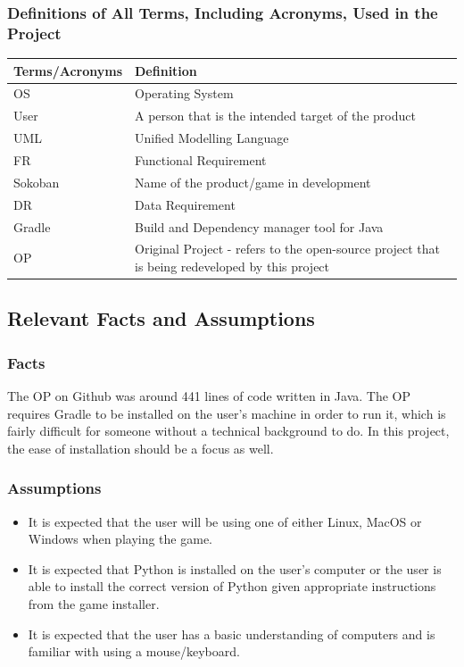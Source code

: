 \documentclass[12pt, titlepage]{article}
\begin{document}
\subsubsection{Definitions of All Terms, Including Acronyms, Used in the Project}
\begin{tabularx}{\textwidth}{|X|X|}
    \hline
     Terms/Acronyms & Definition   \\
     \hline
     OS & Operating System \\
     \hline
     User & A person that is the intended target of the product \\
     \hline
     UML & Unified Modelling Language \\ 
     \hline
     FR & Functional Requirement \\ 
     \hline
     Sokoban & Name of the product/game in development \\
     \hline
     DR & Data Requirement \\ 
     \hline
     Gradle & Build and Dependency manager tool for Java \\
     \hline
     OP & Original Project - refers to the open-source project that is being redeveloped by this project \\ 
     \hline
     
\end{tabularx}
\subsection{Relevant Facts and Assumptions}
\subsubsection{Facts}
The OP on Github was around 441 lines of code written in Java. The OP requires Gradle to be installed on the user's machine in order to run it, which is fairly difficult for someone without a technical background to do. In this project, the ease of installation should be a focus as well.

\subsubsection{Assumptions}
\begin{itemize}
    \item It is expected that the user will be using one of either Linux, MacOS or Windows when playing the game.
    \item It is expected that Python is installed on the user's computer or the user is able to install the correct version of Python given appropriate instructions from the game installer.
    \item It is expected that the user has a basic understanding of computers and is familiar with using a mouse/keyboard.
\end{itemize}
\end{document}
